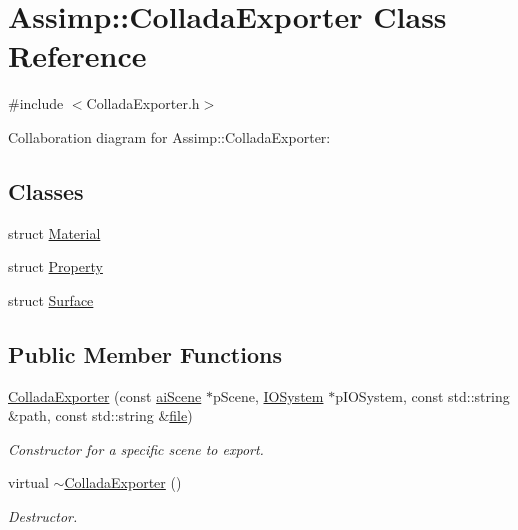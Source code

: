 \hypertarget{class_assimp_1_1_collada_exporter}{\section{Assimp\+:\+:Collada\+Exporter Class Reference}
\label{class_assimp_1_1_collada_exporter}
}


{\ttfamily \#include $<$Collada\+Exporter.\+h$>$}



Collaboration diagram for Assimp\+:\+:Collada\+Exporter\+:
\subsection*{Classes}
\begin{DoxyCompactItemize}
\item 
struct \hyperlink{struct_assimp_1_1_collada_exporter_1_1_material}{Material}
\item 
struct \hyperlink{struct_assimp_1_1_collada_exporter_1_1_property}{Property}
\item 
struct \hyperlink{struct_assimp_1_1_collada_exporter_1_1_surface}{Surface}
\end{DoxyCompactItemize}
\subsection*{Public Member Functions}
\begin{DoxyCompactItemize}
\item 
\hypertarget{class_assimp_1_1_collada_exporter_a5b0a79d70cce72255dba4f6f15cff4d4}{\hyperlink{class_assimp_1_1_collada_exporter_a5b0a79d70cce72255dba4f6f15cff4d4}{Collada\+Exporter} (const \hyperlink{structai_scene}{ai\+Scene} $\ast$p\+Scene, \hyperlink{class_assimp_1_1_i_o_system}{I\+O\+System} $\ast$p\+I\+O\+System, const std\+::string \&path, const std\+::string \&\hyperlink{structfile}{file})}\label{class_assimp_1_1_collada_exporter_a5b0a79d70cce72255dba4f6f15cff4d4}

\begin{DoxyCompactList}\small\item\em Constructor for a specific scene to export. \end{DoxyCompactList}\item 
\hypertarget{class_assimp_1_1_collada_exporter_a7c1625b549542068a727a5acb5988cab}{virtual \hyperlink{class_assimp_1_1_collada_exporter_a7c1625b549542068a727a5acb5988cab}{$\sim$\+Collada\+Exporter} ()}\label{class_assimp_1_1_collada_exporter_a7c1625b549542068a727a5acb5988cab}

\begin{DoxyCompactList}\small\item\em Destructor. \end{DoxyCompactList}\end{DoxyCompactItemize}
